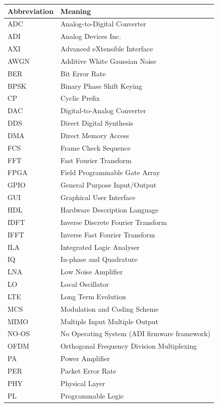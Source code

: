 \documentclass[12pt, a4paper, oneside]{report}
\begin{document}
\begin{longtable}{p{3cm} p{10cm}}
  \toprule
  \textbf{Abbreviation} & \textbf{Meaning} \\
  \midrule
  ADC   & Analog-to-Digital Converter \\
  ADI   & Analog Devices Inc. \\
  AXI   & Advanced eXtensible Interface \\
  AWGN  & Additive White Gaussian Noise \\
  BER   & Bit Error Rate \\
  BPSK  & Binary Phase Shift Keying \\
  CP    & Cyclic Prefix \\
  DAC   & Digital-to-Analog Converter \\
  DDS   & Direct Digital Synthesis \\
  DMA   & Direct Memory Access \\
  FCS   & Frame Check Sequence \\
  FFT   & Fast Fourier Transform \\
  FPGA  & Field Programmable Gate Array \\
  GPIO  & General Purpose Input/Output \\
  GUI   & Graphical User Interface \\
  HDL   & Hardware Description Language \\
  IDFT  & Inverse Discrete Fourier Transform \\
  IFFT  & Inverse Fast Fourier Transform \\
  ILA   & Integrated Logic Analyser \\
  IQ    & In-phase and Quadrature \\
  LNA   & Low Noise Amplifier \\
  LO    & Local Oscillator \\
  LTE   & Long Term Evolution \\
  MCS   & Modulation and Coding Scheme \\
  MIMO  & Multiple Input Multiple Output \\
  NO-OS & No Operating System (ADI firmware framework) \\
  OFDM  & Orthogonal Frequency Division Multiplexing \\
  PA    & Power Amplifier \\
  PER   & Packet Error Rate \\
  PHY   & Physical Layer \\
  PL    & Programmable Logic \\

\end{longtable}
\end{document}
